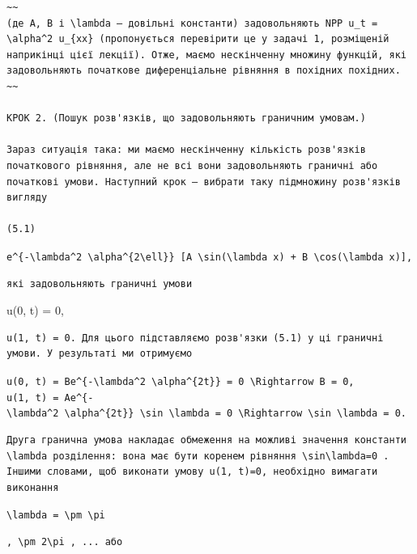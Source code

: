 \documentclass[
  ukrainian,
]{article}
\begin{document}
\begin{verbatim}
~~
(де A, B і \lambda — довільні константи) задовольняють NPP u_t = \alpha^2 u_{xx} (пропонується перевірити це у задачі 1, розміщеній наприкінці цієї лекції). Отже, маємо нескінченну множину функцій, які задовольняють початкове диференціальне рівняння в похідних похідних.
~~

КРОК 2. (Пошук розв'язків, що задовольняють граничним умовам.)

Зараз ситуація така: ми маємо нескінченну кількість розв'язків початкового рівняння, але не всі вони задовольняють граничні або початкові умови. Наступний крок — вибрати таку підмножину розв'язків вигляду

(5.1)
\end{verbatim}

\texttt{e\^{}\{-\textbackslash{}lambda\^{}2\ \textbackslash{}alpha\^{}\{2\textbackslash{}ell\}\}\ {[}A\ \textbackslash{}sin(\textbackslash{}lambda\ x)\ +\ B\ \textbackslash{}cos(\textbackslash{}lambda\ x){]},}

\begin{verbatim}
які задовольняють граничні умови
\end{verbatim}

u(0, t) = 0,

\begin{verbatim}
u(1, t) = 0. Для цього підставляємо розв'язки (5.1) у ці граничні умови. У результаті ми отримуємо
\end{verbatim}

\texttt{u(0,\ t)\ =\ Be\^{}\{-\textbackslash{}lambda\^{}2\ \textbackslash{}alpha\^{}\{2t\}\}\ =\ 0\ \textbackslash{}Rightarrow\ B\ =\ 0,}
\texttt{u(1,\ t)\ =\ Ae\^{}\{-\textbackslash{}lambda\^{}2\ \textbackslash{}alpha\^{}\{2t\}\}\ \textbackslash{}sin\ \textbackslash{}lambda\ =\ 0\ \textbackslash{}Rightarrow\ \textbackslash{}sin\ \textbackslash{}lambda\ =\ 0.}

\begin{verbatim}
Друга гранична умова накладає обмеження на можливі значення константи \lambda розділення: вона має бути коренем рівняння \sin\lambda=0 . Іншими словами, щоб виконати умову u(1, t)=0, необхідно вимагати виконання
\end{verbatim}

\texttt{\textbackslash{}lambda\ =\ \textbackslash{}pm\ \textbackslash{}pi}

\begin{verbatim}
, \pm 2\pi , ... або
\end{verbatim}
\end{document}
